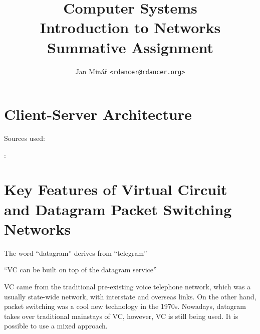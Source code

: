 \documentclass[10pt]{report}
\author{Jan Minář {\tt <rdancer@rdancer.org>}}
\title{Computer Systems\\Introduction to Networks\\Summative Assignment}
\begin{document}


\maketitle




\chapter{Client-Server Architecture}

Sources used:
\cite{slides-lecture-4}

:%



\chapter{Key Features of Virtual Circuit and Datagram Packet Switching
	Networks}


The word ``datagram'' derives from ``telegram'' \cite[p 141]{russell}


``VC can be built on top of the datagram service'' \cite[p 141]{russell}

VC came from the traditional pre-existing voice telephone network, which was a usually state-wide network, with interstate and overseas links.  On the other hand, packet switching was a cool new technology in the 1970s.  Nowadays, datagram takes over traditional mainstays of VC, however, VC is still being used.  It is possible to use a mixed approach.
\end{document}
